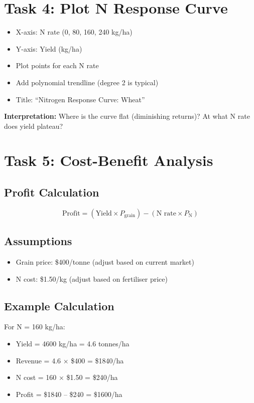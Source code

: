 \section{Task 4: Plot N Response Curve}

\begin{itemize}
  \item X-axis: N rate (0, 80, 160, 240 kg/ha)
  \item Y-axis: Yield (kg/ha)
  \item Plot points for each N rate
  \item Add polynomial trendline (degree 2 is typical)
  \item Title: ``Nitrogen Response Curve: Wheat''
\end{itemize}

\textbf{Interpretation:} Where is the curve flat (diminishing returns)? At what N rate does yield plateau?

\section{Task 5: Cost-Benefit Analysis}

\subsection{Profit Calculation}

\[
\text{Profit} = (\text{Yield} \times P_{\text{grain}}) - (\text{N rate} \times P_{\text{N}})
\]

\subsection{Assumptions}

\begin{itemize}
  \item Grain price: \$400/tonne (adjust based on current market)
  \item N cost: \$1.50/kg (adjust based on fertiliser price)
\end{itemize}

\subsection{Example Calculation}

For N = 160 kg/ha:
\begin{itemize}
  \item Yield = 4600 kg/ha = 4.6 tonnes/ha
  \item Revenue = 4.6 × \$400 = \$1840/ha
  \item N cost = 160 × \$1.50 = \$240/ha
  \item Profit = \$1840 -- \$240 = \$1600/ha
\end{itemize}

